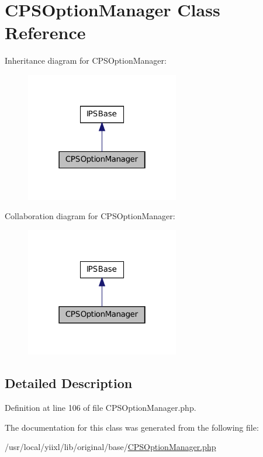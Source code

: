 \hypertarget{classCPSOptionManager}{
\section{CPSOptionManager Class Reference}
\label{classCPSOptionManager}
}


Inheritance diagram for CPSOptionManager:\nopagebreak
\begin{figure}[H]
\begin{center}
\leavevmode
\includegraphics[width=190pt]{classCPSOptionManager__inherit__graph}
\end{center}
\end{figure}


Collaboration diagram for CPSOptionManager:\nopagebreak
\begin{figure}[H]
\begin{center}
\leavevmode
\includegraphics[width=190pt]{classCPSOptionManager__coll__graph}
\end{center}
\end{figure}


\subsection{Detailed Description}


Definition at line 106 of file CPSOptionManager.php.



The documentation for this class was generated from the following file:\begin{DoxyCompactItemize}
\item 
/usr/local/yiixl/lib/original/base/\hyperlink{CPSOptionManager_8php}{CPSOptionManager.php}\end{DoxyCompactItemize}
